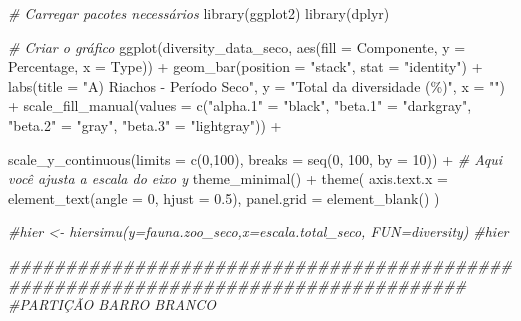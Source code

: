 \documentclass[
  letterpaper,
  DIV=11,
  numbers=noendperiod]{scrartcl}
\newenvironment{Shaded}{}{}
\newcommand{\AttributeTok}[1]{\textcolor[rgb]{0.49,0.56,0.16}{#1}}
\newcommand{\CommentTok}[1]{\textcolor[rgb]{0.38,0.63,0.69}{\textit{#1}}}
\newcommand{\DecValTok}[1]{\textcolor[rgb]{0.25,0.63,0.44}{#1}}
\newcommand{\DocumentationTok}[1]{\textcolor[rgb]{0.73,0.13,0.13}{\textit{#1}}}
\newcommand{\FloatTok}[1]{\textcolor[rgb]{0.25,0.63,0.44}{#1}}
\newcommand{\FunctionTok}[1]{\textcolor[rgb]{0.02,0.16,0.49}{#1}}
\newcommand{\NormalTok}[1]{#1}
\newcommand{\OtherTok}[1]{\textcolor[rgb]{0.00,0.44,0.13}{#1}}
\newcommand{\SpecialCharTok}[1]{\textcolor[rgb]{0.25,0.44,0.63}{#1}}
\newcommand{\StringTok}[1]{\textcolor[rgb]{0.25,0.44,0.63}{#1}}
\begin{document}
\begin{Shaded}
\begin{Highlighting}[numbers=left,,]
\CommentTok{\# Carregar pacotes necessários}
\FunctionTok{library}\NormalTok{(ggplot2)}
\FunctionTok{library}\NormalTok{(dplyr)}

\CommentTok{\# Criar o gráfico}
\FunctionTok{ggplot}\NormalTok{(diversity\_data\_seco, }\FunctionTok{aes}\NormalTok{(}\AttributeTok{fill =}\NormalTok{ Componente, }\AttributeTok{y =}\NormalTok{ Percentage, }\AttributeTok{x =}\NormalTok{ Type)) }\SpecialCharTok{+}
  \FunctionTok{geom\_bar}\NormalTok{(}\AttributeTok{position =} \StringTok{"stack"}\NormalTok{, }\AttributeTok{stat =} \StringTok{"identity"}\NormalTok{) }\SpecialCharTok{+}
  \FunctionTok{labs}\NormalTok{(}\AttributeTok{title =} \StringTok{"A) Riachos {-} Período Seco"}\NormalTok{,}
       \AttributeTok{y =} \StringTok{"Total da diversidade (\%)"}\NormalTok{,}
       \AttributeTok{x =} \StringTok{""}\NormalTok{) }\SpecialCharTok{+}
  \FunctionTok{scale\_fill\_manual}\NormalTok{(}\AttributeTok{values =} \FunctionTok{c}\NormalTok{(}\StringTok{"alpha.1"} \OtherTok{=} \StringTok{"black"}\NormalTok{,}
                               \StringTok{"beta.1"} \OtherTok{=} \StringTok{"darkgray"}\NormalTok{,}
                               \StringTok{"beta.2"} \OtherTok{=} \StringTok{"gray"}\NormalTok{,}
                               \StringTok{"beta.3"} \OtherTok{=} \StringTok{"lightgray"}\NormalTok{)) }\SpecialCharTok{+}
  
  \FunctionTok{scale\_y\_continuous}\NormalTok{(}\AttributeTok{limits =} \FunctionTok{c}\NormalTok{(}\DecValTok{0}\NormalTok{,}\DecValTok{100}\NormalTok{), }\AttributeTok{breaks =} \FunctionTok{seq}\NormalTok{(}\DecValTok{0}\NormalTok{, }\DecValTok{100}\NormalTok{, }\AttributeTok{by =} \DecValTok{10}\NormalTok{)) }\SpecialCharTok{+} \CommentTok{\# Aqui você ajusta a escala do eixo y}
  \FunctionTok{theme\_minimal}\NormalTok{() }\SpecialCharTok{+}
  \FunctionTok{theme}\NormalTok{(}
    \AttributeTok{axis.text.x =} \FunctionTok{element\_text}\NormalTok{(}\AttributeTok{angle =} \DecValTok{0}\NormalTok{, }\AttributeTok{hjust =} \FloatTok{0.5}\NormalTok{),}
    \AttributeTok{panel.grid =} \FunctionTok{element\_blank}\NormalTok{()}
\NormalTok{  )}

\CommentTok{\#hier \textless{}{-} hiersimu(y=fauna.zoo\_seco,x=escala.total\_seco, FUN=diversity)}
\CommentTok{\#hier}

\DocumentationTok{\#\#\#\#\#\#\#\#\#\#\#\#\#\#\#\#\#\#\#\#\#\#\#\#\#\#\#\#\#\#\#\#\#\#\#\#\#\#\#\#\#\#\#\#\#\#\#\#\#\#\#\#\#\#\#\#\#\#\#\#\#\#\#\#\#\#\#\#\#\#\#\#\#\#\#\#\#\#\#\#\#\#\#\#}
\CommentTok{\#PARTIÇÃO BARRO BRANCO}


\end{Highlighting}
\end{Shaded}
\end{document}

